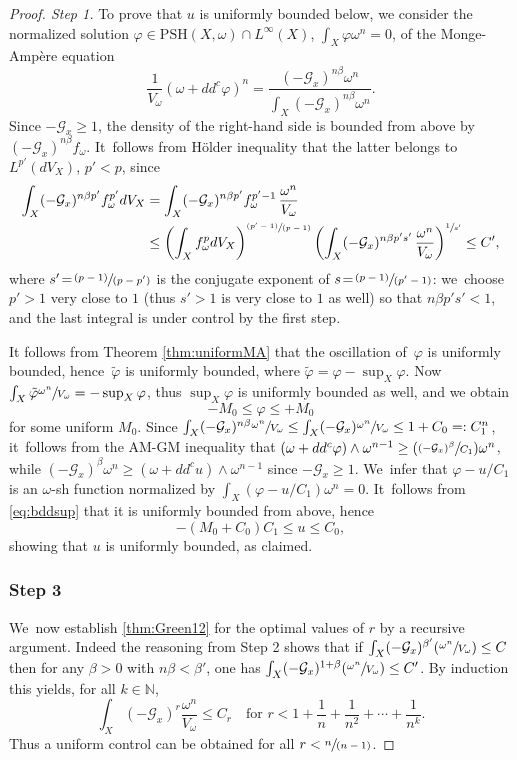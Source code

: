 \documentclass[JEP,XML,SOM,Unicode,published]{cedram}
\newcommand{\Psfrac}[2]{(\sfrac{#1}{#2})}
\newcommand{\spfrac}[2]{\sfrac{#1}{(#2)}}
\newcommand{\pspfrac}[2]{\sfrac{(#1)}{(#2)}}
\theoremstyle{definition}
\newcommand{\N}{\mathbb N}
\let\f\varphi
\newcommand \PSH {\mathrm{PSH}}
\begin{document}
\begin{proof}[Proof. Step 1]
To prove that $u$ is uniformly bounded below, we
consider the normalized solution $\f \in\PSH(X,\omega) \cap L^{\infty}(X)$, $\int_X \f \omega^n=0$,
of the Monge-Ampère equation
\[
\frac{1}{V_{\omega}} (\omega+dd^c \f)^n = \frac{(-{\mathcal G}_x)^{n\beta} \omega^n}{\int_X (-{\mathcal G}_x)^{n\beta} \omega^n}.
\]
Since $-{\mathcal G}_x \geq 1$, the density of the right-hand side is bounded from above by $(-{\mathcal G}_x)^{n\beta} f_{\omega}$. It~follows from Hölder inequality that the latter belongs to $L^{p'}(dV_X)$, $p'<p$, since
\begin{align*}
\int_X (-{\mathcal G}_x)^{n\beta p'} f_{\omega}^{p'} dV_X
&= \int_X (-{\mathcal G}_x)^{n\beta p'} f_{\omega}^{p'-1}\, \frac{\omega^n}{V_{\omega}} \\
&\leq  \left( \int_X f_{\omega}^p dV_X \right)^{\pspfrac{p'-1}{p-1}}
\left( \int_X (-{\mathcal G}_x)^{n\beta p's'}\, \frac{\omega^n}{V_{\omega}} \right)^{\sfrac{1}{s'}}
\leq C',
\end{align*}
where $s'\!=\!\pspfrac{p-1}{p-p'}$ is the conjugate exponent of $s\!=\!\pspfrac{p-1}{p'-1}$:
we~choose $p'>1$ very close to $1$ (thus $s'>1$ is very close to $1$ as well) so that
$n\beta p' s'<1$, and the last integral is under control by the first step.

It follows from Theorem \ref{thm:uniformMA} that the oscillation of~$\f$ is uniformly bounded,
hence~$\tilde{\f}$ is uniformly bounded, where $\tilde{\f}=\f-\sup_X \f$.
Now $\int_X \tilde{\f} \sfrac{\omega^n}{V_{\omega}}=-\sup_X \f$, thus $\sup_X \f$ is uniformly bounded as well,
and we obtain
\[
-M_0 \leq \f \leq +M_0
\]
for some uniform $M_0$.
Since $\int_X (-{\mathcal G}_x)^{n\beta} \sfrac{\omega^n}{V_{\omega}}
\leq \int_X (-{\mathcal G}_x) \sfrac{\omega^n}{V_{\omega}} \leq 1+C_0=:C_1^n$, it~follows from the AM-GM inequality that $(\omega+dd^c \f) \wedge \omega^{n-1} \geq \Psfrac{(-{\mathcal G}_x)^{\beta}}{C_1} \omega^n$,
while $ (-{\mathcal G}_x)^{\beta} \omega^n \geq (\omega+dd^c u) \wedge \omega^{n-1}$ since $-{\mathcal G}_x \geq 1$. We~infer that $\f-u/C_1$ is an $\omega$-sh function
normalized by $\int_X (\f-u/C_1) \omega^n=0$. It~follows from \eqref{eq:bddsup} that
it is uniformly bounded from above, hence
\[
-(M_0+C_0)C_1 \leq u \leq C_0,
\]
showing that $u$ is uniformly bounded, as claimed.

\subsubsection*{Step 3}
We~now establish \eqref{thm:Green12} for the optimal values of $r$ by a recursive argument.
Indeed the reasoning from Step 2 shows that if $\int_X (-{\mathcal G}_x)^{\beta'} \Psfrac{\omega^n}{V_{\omega}} \leq C$
then for any $\beta>0$ with $n\beta < \beta'$, one has $\int_X (-{\mathcal G}_x)^{1+\beta} \Psfrac{\omega^n}{V_{\omega}} \leq C'$.
By induction this yields, for all $k \in \N$,
\[
\int_X (-{\mathcal G}_x)^{r} \frac{\omega^n}{V_{\omega}} \leq C_r
\quad \text{for }
r<1+\frac{1}{n}+\frac{1}{n^2}+\cdots+\frac{1}{n^k}.
\]
Thus a uniform control can be obtained for all $r<\spfrac{n}{n-1}$.


\end{proof}
\end{document}
